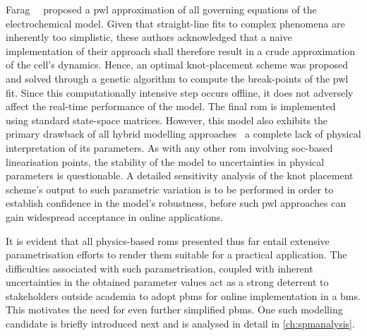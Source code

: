 Farag~\etal{}~\cite{Farag2017}  proposed   a  \gls{pwl}  approximation   of  all
governing equations of the electrochemical  model. Given that straight-line fits
to complex phenomena  are inherently too simplistic,  these authors acknowledged
that a naive implementation of their  approach shall therefore result in a crude
approximation of  the cell's dynamics.  Hence, an optimal  knot-placement scheme
was proposed and solved through a  genetic algorithm to compute the break-points
of the \gls{pwl} fit. Since  this computationally intensive step occurs offline,
it does not  adversely affect the real-time performance of  the model. The final
\gls{rom}  is implemented  using  standard state-space  matrices. However,  this
model  also exhibits  the primary  drawback of  all hybrid  modelling approaches
\ie~a complete lack of physical  interpretation of its parameters. As with any
other \gls{rom} involving \gls{soc}-based linearisation points, the stability of
the model  to uncertainties in  physical parameters is questionable.  A detailed
sensitivity analysis  of the knot  placement scheme's output to  such parametric
variation is  to be performed  in order to  establish confidence in  the model's
robustness, before such  \gls{pwl} approaches can gain  widespread acceptance in
online applications.




It  is evident  that all  physics-based  \glspl{rom} presented  thus far  entail
extensive parametrisation efforts
to render  them suitable for  a practical
application. The difficulties associated with such parametrisation, coupled with
inherent  uncertainties  in  the  obtained  parameter values  act  as  a  strong
deterrent  to stakeholders  outside  academia to  adopt  \glspl{pbm} for  online
implementation  in  a  \gls{bms}.  This  motivates the  need  for  even  further
simplified \glspl{pbm}. One such modelling  candidate is briefly introduced next
and is analysed in detail in \cref{ch:spmanalysis}.


